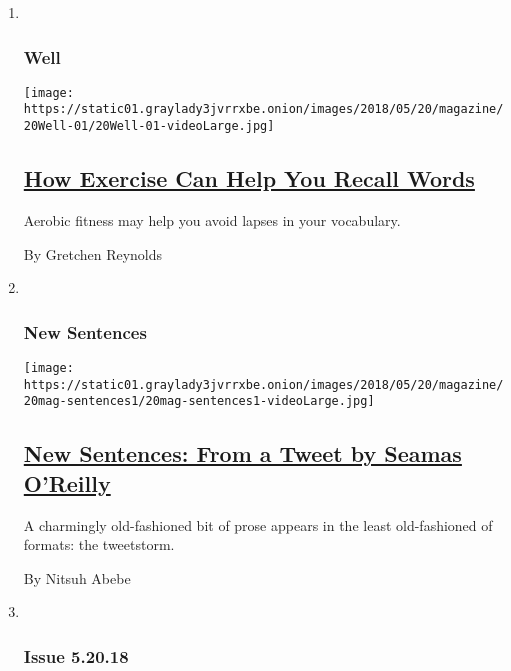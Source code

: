\begin{enumerate}
\def\labelenumi{\arabic{enumi}.}
\item ~
  \hypertarget{well}{%
  \subsubsection{Well}\label{well}}

  \texttt{[image: https://static01.graylady3jvrrxbe.onion/images/2018/05/20/magazine/20Well-01/20Well-01-videoLarge.jpg]}

  \hypertarget{how-exercise-can-help-you-recall-words}{%
  \subsection{\texorpdfstring{\href{/2018/05/15/magazine/exercise-language-muscle-memory-word-recall-aging-fitness.html}{How
  Exercise Can Help You Recall
  Words}}{How Exercise Can Help You Recall Words}}\label{how-exercise-can-help-you-recall-words}}

  Aerobic fitness may help you avoid lapses in your vocabulary.

  By Gretchen Reynolds
\item ~
  \hypertarget{new-sentences}{%
  \subsubsection{New Sentences}\label{new-sentences}}

  \texttt{[image: https://static01.graylady3jvrrxbe.onion/images/2018/05/20/magazine/20mag-sentences1/20mag-sentences1-videoLarge.jpg]}

  \hypertarget{new-sentences-from-a-tweet-by-seamas-oreilly}{%
  \subsection{\texorpdfstring{\href{/2018/05/16/magazine/new-sentences-from-a-tweet-by-seamas-oreilly.html}{New
  Sentences: From a Tweet by Seamas
  O'Reilly}}{New Sentences: From a Tweet by Seamas O'Reilly}}\label{new-sentences-from-a-tweet-by-seamas-oreilly}}

  A charmingly old-fashioned bit of prose appears in the least
  old-fashioned of formats: the tweetstorm.

  By Nitsuh Abebe
\item ~
  \hypertarget{issue-52018}{%
  \subsubsection{Issue 5.20.18}\label{issue-52018}}


\end{enumerate}

